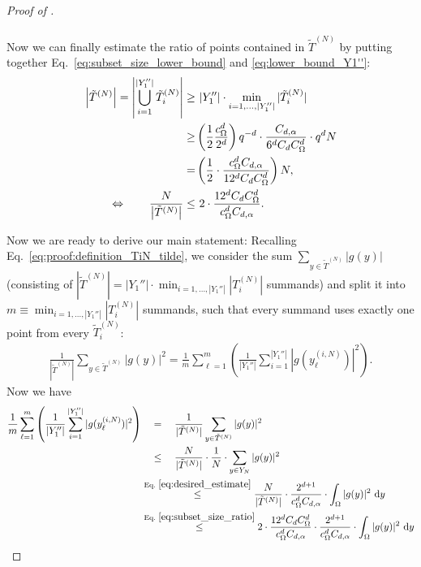 \documentclass[a4paper, 10pt]{article}
\begin{document}
\begin{proof}[Proof of ]
\begin{itemize}
\begin{align}
\end{align}
Now we can finally estimate the ratio of points contained in $\tilde{T}^{(N)}$ by putting together Eq.~\eqref{eq:subset_size_lower_bound} and \eqref{eq:lower_bound_Y1''}:
\begin{align}
\label{eq:subset_size_ratio}
\left| \tilde{T}^{(N)} \right| = \left| \bigcup_{i=1}^{|Y_1''|} \tilde{T}_i^{(N)} \right| \geq& ~ |Y_1''| \cdot \min_{i=1, ..., |Y_1''|} | \tilde{T}_i^{(N)} | \notag \\
\geq& \left( \frac{1}{2} \frac{c_\Omega^d}{2^d} \right) q^{-d} \cdot \frac{C_{d, \alpha}}{6^d C_d C_\Omega^d} \cdot q^d N \notag \\
=& \left( \frac{1}{2} \cdot \frac{c_\Omega^d C_{d, \alpha}}{12^d C_d C_\Omega^d} \right)  N, \notag \\
\Leftrightarrow \qquad \frac{N}{\left| \tilde{T}^{(N)} \right|} \leq& ~ 2 \cdot \frac{12^d C_d C_\Omega^d}{c_\Omega^d C_{d, \alpha}}.
\end{align}
\end{itemize}
Now we are ready to derive our main statement:
Recalling Eq.~\eqref{eq:proof:definition_TiN_tilde},
we consider the sum $\sum_{y \in \tilde{T}^{(N)}} |g(y)|$ (consisting of $|\tilde{T}^{(N)}| = |Y_1''| \cdot \min_{i=1, ..., |Y_1''|} |T_i^{(N)}|$ summands)
and split it into $m \equiv \min_{i=1, ..., |Y_1''|} |T_i^{(N)}|$ summands, such that every summand uses exactly one point from every $\tilde{T}_i^{(N)}$:
\begin{align*}
\frac{1}{|\tilde{T}^{(N)}|} \sum_{y \in \tilde{T}^{(N)}} |g(y)|^2
= \frac{1}{m} \sum_{\ell = 1}^m \left( \frac{1}{|Y_1''|} \sum_{i=1}^{|Y_1''|} |g(y_{\ell}^{(i, N)})|^2 \right).
\end{align*}
Now we have
\begin{align*}
\frac{1}{m} \sum_{\ell = 1}^m \left( \frac{1}{|Y_1''|} \sum_{i=1}^{|Y_1''|} |g(y_{\ell}^{(i, N)})|^2 \right) 
&~~~=~~~ \frac{1}{|\tilde{T}^{(N)}|} \sum_{y \in \tilde{T}^{(N)}} |g(y)|^2 \\
%
&~~~\leq~~~ \frac{N}{|\tilde{T}^{(N)}|} \cdot \frac{1}{N} \cdot \sum_{y \in Y_N} |g(y)|^2 \\
&\stackrel{\text{Eq.\ }\eqref{eq:desired_estimate}}{\leq} \frac{N}{|\tilde{T}^{(N)}|} \cdot \frac{2^{d+1}}{c_\Omega^{d} C_{d, \alpha}} \cdot \int_{\Omega} |g(y)|^2 ~ \mathrm{d}y \\ 
&\stackrel{\text{Eq.\ }\eqref{eq:subset_size_ratio}}{\leq} 2 \cdot \frac{12^d C_d C_\Omega^d}{c_\Omega^d C_{d, \alpha}} \cdot \frac{2^{d+1}}{c_\Omega^{d} C_{d, \alpha}} \cdot \int_{\Omega} |g(y)|^2 ~ \mathrm{d}y \\

\end{align*}
\end{proof}
\end{document}
